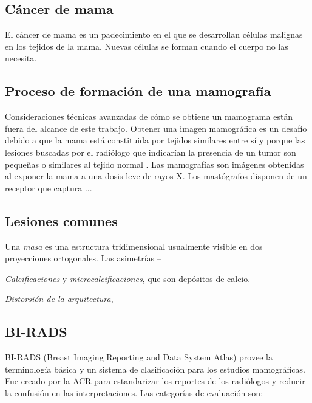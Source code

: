 \subsection{Cáncer de mama} %
El cáncer de mama es un padecimiento en el que se desarrollan células malignas
en los tejidos de la mama. Nuevas células se forman cuando el cuerpo no las
necesita. 

\subsection{Proceso de formación de una mamografía}

Consideraciones técnicas avanzadas de cómo se obtiene un mamograma están fuera
del alcance de este trabajo. Obtener una imagen mamográfica es un desafío
debido a que la mama está constituida por tejidos similares entre sí y porque
las lesiones buscadas por el radiólogo que indicarían la presencia de un tumor
son pequeñas o similares al tejido normal \cite{mxcancer}. Las mamografías son
imágenes obtenidas al exponer la mama a una dosis leve de rayos X. Los
mastógrafos disponen de un receptor que captura ...


\subsection{Lesiones comunes}


Una \textit{masa} es una estructura tridimensional usualmente visible en dos
proyecciones ortogonales. Las {asimetrías} --

\textit{Calcificaciones} y \textit{microcalcificaciones}, que son depósitos de calcio.

\textit{Distorsión de la arquitectura}, 

\subsection{BI-RADS}

BI-RADS (Breast Imaging Reporting and Data System Atlas)
\cite{reston2003birads} provee la terminología básica y un sistema de
clasificación para los estudios mamográficas. Fue creado por la ACR para
estandarizar los reportes de los radiólogos y reducir la confusión en las
interpretaciones. Las categorías de evaluación son:

